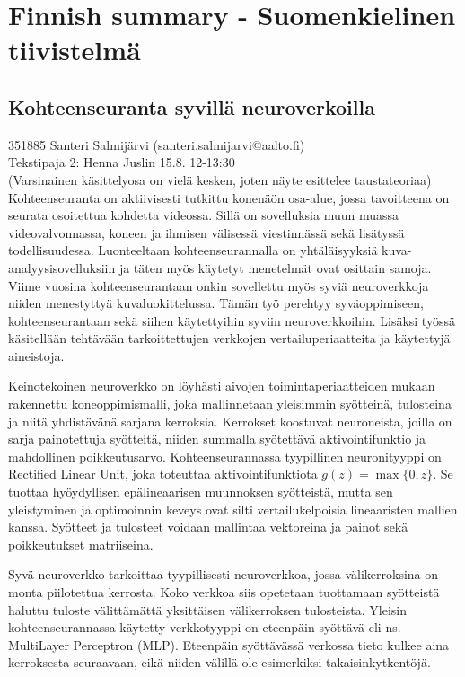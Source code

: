 \section{Finnish summary - Suomenkielinen tiivistelmä}

\clearpage

\setcounter{subsection}{-1}
\let\oldsubsection=\thesubsection
\renewcommand{\thesubsection}{\thesection}

\subsection{Kohteenseuranta syvillä neuroverkoilla}

351885 Santeri Salmijärvi (santeri.salmijarvi@aalto.fi)\\
Tekstipaja 2: Henna Juslin 15.8. 12-13:30\\
(Varsinainen käsittelyosa on vielä kesken, joten näyte esittelee taustateoriaa)\\
Kohteenseuranta on aktiivisesti tutkittu konenäön osa-alue, jossa tavoitteena on seurata
osoitettua kohdetta videossa. Sillä on sovelluksia muun muassa videovalvonnassa, koneen ja
ihmisen välisessä viestinnässä sekä lisätyssä todellisuudessa. Luonteeltaan kohteenseurannalla
on yhtäläisyyksiä kuva-analyysisovelluksiin ja täten myös käytetyt menetelmät ovat osittain
samoja. Viime vuosina kohteenseurantaan onkin sovellettu myös syviä neuroverkkoja niiden
menestyttyä kuvaluokittelussa. Tämän työ perehtyy syväoppimiseen, kohteenseurantaan sekä
siihen käytettyihin syviin neuroverkkoihin. Lisäksi työssä käsitellään tehtävään tarkoittettujen
verkkojen vertailuperiaatteita ja käytettyjä aineistoja.

Keinotekoinen neuroverkko on löyhästi aivojen toimintaperiaatteiden mukaan rakennettu
koneoppimismalli, joka mallinnetaan yleisimmin syötteinä, tulosteina ja niitä yhdistävänä
sarjana kerroksia. Kerrokset koostuvat neuroneista, joilla on sarja painotettuja syötteitä,
niiden summalla syötettävä aktivointifunktio ja mahdollinen poikkeutusarvo. Kohteenseurannassa
tyypillinen neuronityyppi on Rectified Linear Unit, joka toteuttaa aktivointifunktiota
$g (z) = \max\{0,z\}$. Se tuottaa hyöydyllisen epälineaarisen muunnoksen syötteistä, mutta
sen yleistyminen ja optimoinnin keveys ovat silti vertailukelpoisia lineaaristen mallien kanssa.
Syötteet ja tulosteet voidaan mallintaa vektoreina ja painot sekä poikkeutukset matriiseina.

Syvä neuroverkko tarkoittaa tyypillisesti neuroverkkoa, jossa välikerroksina on monta
piilotettua kerrosta. Koko verkkoa siis opetetaan tuottamaan syötteistä haluttu tuloste
välittämättä yksittäisen välikerroksen tulosteista. Yleisin kohteenseurannassa käytetty
verkkotyyppi on eteenpäin syöttävä eli ns. MultiLayer Perceptron (MLP). Eteenpäin syöttävässä
verkossa tieto kulkee aina kerroksesta seuraavaan, eikä niiden välillä ole esimerkiksi
takaisinkytkentöjä.

